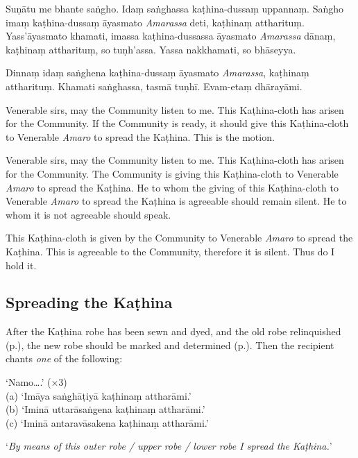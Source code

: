 Suṇātu me bhante saṅgho. Idaṃ saṅghassa kaṭhina-dussaṃ uppannaṃ. Saṅgho imaṃ
kaṭhina-dussaṃ āyasmato \emph{Amarassa} deti, kaṭhinaṃ attharituṃ.
Yass'āyasmato khamati, imassa kaṭhina-dussassa āyasmato \emph{Amarassa} dānaṃ,
kaṭhinaṃ attharituṃ, so tuṇh'assa. Yassa nakkhamati, so bhāseyya.

Dinnaṃ idaṃ saṅghena kaṭhina-dussaṃ āyasmato \emph{Amarassa}, kaṭhinaṃ
attharituṃ. Khamati saṅghassa, tasmā tuṇhī. Evam-etaṃ dhārayāmi.


\begin{english}
Venerable sirs, may the Community listen to me. This Kaṭhina-cloth has arisen
for the Community. If the Community is ready, it should give this Kaṭhina-cloth
to Venerable \emph{Amaro} to spread the Kaṭhina. This is the motion.

\bigskip

Venerable sirs, may the Community listen to me. This Kaṭhina-cloth has arisen
for the Community. The Community is giving this Kaṭhina-cloth to Venerable
\emph{Amaro} to spread the Kaṭhina. He to whom the giving of this Kaṭhina-cloth
to Venerable \emph{Amaro} to spread the Kaṭhina is agreeable should remain
silent. He to whom it is not agreeable should speak.

\bigskip

This Kaṭhina-cloth is given by the Community to Venerable \emph{Amaro} to
spread the Kaṭhina. This is agreeable to the Community, therefore it is silent.
Thus do I hold it.
\end{english}

\subsection{Spreading the Kaṭhina}
\label{spreading-the-kathina}

After the Kaṭhina robe has been sewn and dyed, and the old robe relinquished
(p.\pageref{relinquish-robe}), the new robe should be marked and determined
(p.\pageref{determine-robe}). Then the recipient chants \emph{one} of the
following:

‘Namo….’ (×3)\\
(a) ‘Imāya saṅghāṭiyā kaṭhinaṃ attharāmi.’\\
(b) ‘Iminā uttarāsaṅgena kaṭhinaṃ attharāmi.’\\
(c) ‘Iminā antaravāsakena kaṭhinaṃ attharāmi.’

‘\emph{By means of this outer robe / upper robe / lower robe I spread the Kaṭhina.}’

